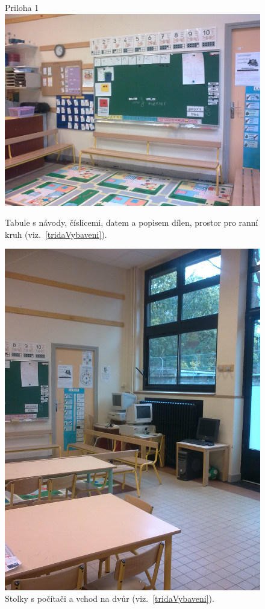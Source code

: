 	\begin{figure}[tb]
		\centering
		Priloha 1\\
		\includegraphics[height = 0.35\textheight]{./fotky/Obr1.jpg}
		\caption{
			Tabule s návody, číslicemi, datem a popisem dílen, prostor pro ranní kruh (viz.~\ref{tridaVybaveni}).
		}
		\label{Obr1}
	\end{figure}

	\begin{figure}[tb]
		\centering
		\includegraphics[height = 0.35\textheight]{./fotky/Obr2.jpg}
		\caption{
			Stolky s počítači a vchod na dvůr (viz.~\ref{tridaVybaveni}).
		}
		\label{Obr2}
	\end{figure}

